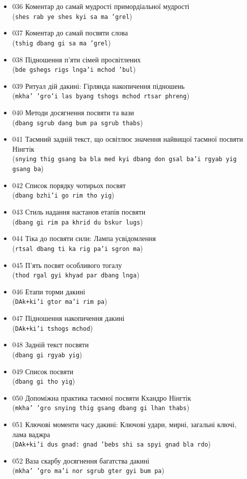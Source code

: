 \documentclass{article}
\begin{document}
\begin{itemize}
\item 036 Коментар до самай мудрості примордіальної мудрості \\ (\texttt{shes rab ye shes kyi sa ma 'grel})
\item 037 Коментар до самай посвяти слова \\ (\texttt{tshig dbang gi sa ma 'grel})
\item 038 Підношення п'яти сімей просвітлених \\ (\texttt{bde gshegs rigs lnga'i mchod 'bul})
\item 039 Ритуал дій дакині: Гірлянда накопичення підношень \\ (\texttt{mkha' 'gro'i las byang tshogs mchod rtsar phreng})
\item 040 Методи досягнення посвяти та вази \\ (\texttt{dbang sgrub dang bum pa sgrub thabs})
\item 041 Таємний задній текст, що освітлює значення найвищої таємної посвяти Нінгтік \\ (\texttt{snying thig gsang ba bla med kyi dbang don gsal ba'i rgyab yig gsang ba})
\item 042 Список порядку чотирьох посвят \\ (\texttt{dbang bzhi'i go rim tho yig})
\item 043 Стиль надання настанов етапів посвяти \\ (\texttt{dbang gi rim pa khrid du bskur lugs})
\item 044 Тіка до посвяти сили: Лампа усвідомлення \\ (\texttt{rtsal dbang ti ka rig pa'i sgron ma})
\item 045 П'ять посвят особливого тогалу \\ (\texttt{thod rgal gyi khyad par dbang lnga})
\item 046 Етапи торми дакині \\ (\texttt{DAk+ki'i gtor ma'i rim pa})
\item 047 Підношення накопичення дакині \\ (\texttt{DAk+ki'i tshogs mchod})
\item 048 Задній текст посвяти \\ (\texttt{dbang gi rgyab yig})
\item 049 Список посвяти \\ (\texttt{dbang gi tho yig})
\item 050 Допоміжна практика таємної посвяти Кхандро Нінгтік \\ (\texttt{mkha' 'gro snying thig gsang dbang gi lhan thabs})
\item 051 Ключові моменти часу дакині: Ключові удари, мирні, загальні ключі, лама ваджра \\ (\texttt{DAk+ki'i dus gnad: gnad 'bebs shi sa spyi gnad bla rdo})
\item 052 Ваза скарбу досягнення багатства дакині \\ (\texttt{mkha' 'gro ma'i nor sgrub gter gyi bum pa})
\end{itemize}
\endgroup
\end{document}
